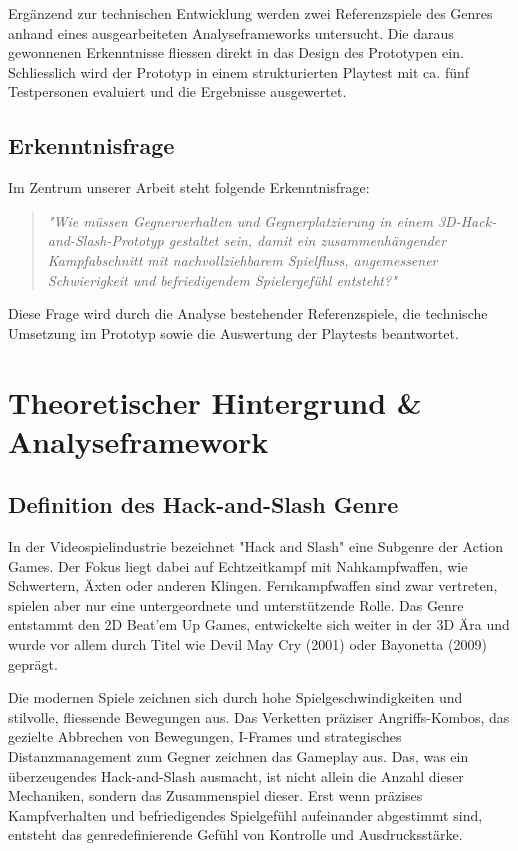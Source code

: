 \documentclass[10pt, a4paper]{article}
\begin{document}
Ergänzend zur technischen Entwicklung werden zwei Referenzspiele des Genres anhand eines ausgearbeiteten Analyseframeworks untersucht. Die daraus gewonnenen Erkenntnisse fliessen direkt in das Design des Prototypen ein. Schliesslich wird der Prototyp in einem strukturierten Playtest mit ca. fünf Testpersonen evaluiert und die Ergebnisse ausgewertet.

\subsection{Erkenntnisfrage}

Im Zentrum unserer Arbeit steht folgende Erkenntnisfrage:

\begin{quote}
\textit{"Wie müssen Gegnerverhalten und Gegnerplatzierung in einem 3D-Hack-and-Slash-Prototyp gestaltet sein, damit ein zusammenhängender Kampfabschnitt mit nachvollziehbarem Spielfluss, angemessener Schwierigkeit und befriedigendem Spielergefühl entsteht?"}
\end{quote}

Diese Frage wird durch die Analyse bestehender Referenzspiele, die technische Umsetzung im Prototyp sowie die Auswertung der Playtests beantwortet.

\section{Theoretischer Hintergrund \& Analyseframework}
\subsection{Definition des Hack-and-Slash Genre}

In der Videospielindustrie bezeichnet "Hack and Slash" eine Subgenre der Action Games. Der Fokus liegt dabei auf Echtzeitkampf mit Nahkampfwaffen, wie Schwertern, Äxten oder anderen Klingen. Fernkampfwaffen sind zwar vertreten, spielen aber nur eine untergeordnete und unterstützende Rolle. Das Genre entstammt den 2D Beat'em Up Games, entwickelte sich weiter in der 3D Ära und wurde vor allem durch Titel wie Devil May Cry (2001) oder Bayonetta (2009) geprägt.

Die modernen Spiele zeichnen sich durch hohe Spielgeschwindigkeiten und stilvolle, fliessende Bewegungen aus. Das Verketten präziser Angriffs-Kombos, das gezielte Abbrechen von Bewegungen, I-Frames und strategisches Distanzmanagement zum Gegner zeichnen das Gameplay aus. Das, was ein überzeugendes Hack-and-Slash ausmacht, ist nicht allein die Anzahl dieser Mechaniken, sondern das Zusammenspiel dieser. Erst wenn präzises Kampfverhalten und befriedigendes Spielgefühl aufeinander abgestimmt sind, entsteht das genredefinierende Gefühl von Kontrolle und Ausdrucksstärke.
\end{document}

